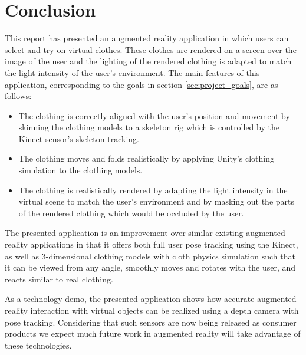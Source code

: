 \documentclass[twocolumn,a4paper]{article}
\begin{document}

\section{Conclusion}
\label{sec:conclusion}

This report has presented an augmented reality application in which users can select and try on virtual clothes. These clothes are rendered on a screen over the image of the user and the lighting of the rendered clothing is adapted to match the light intensity of the user's environment. The main features of this application, corresponding to the goals in section \ref{sec:project_goals}, are as follows:
\begin{itemize}
\item The clothing is correctly aligned with the user's position and movement by skinning the clothing models to a skeleton rig which is controlled by the Kinect sensor's skeleton tracking.
\item The clothing moves and folds realistically by applying Unity's clothing simulation to the clothing models.
\item The clothing is realistically rendered by adapting the light intensity in the virtual scene to match the user's environment and by masking out the parts of the rendered clothing which would be occluded by the user.
\end{itemize}

The presented application is an improvement over similar existing augmented reality applications in that it offers both full user pose tracking using the Kinect, as well as 3-dimensional clothing models with cloth physics simulation such that it can be viewed from any angle, smoothly moves and rotates with the user, and reacts similar to real clothing.

As a technology demo, the presented application shows how accurate augmented reality interaction with virtual objects can be realized using a depth camera with pose tracking. Considering that such sensors are now being released as consumer products we expect much future work in augmented reality will take advantage of these technologies.
\end{document}
